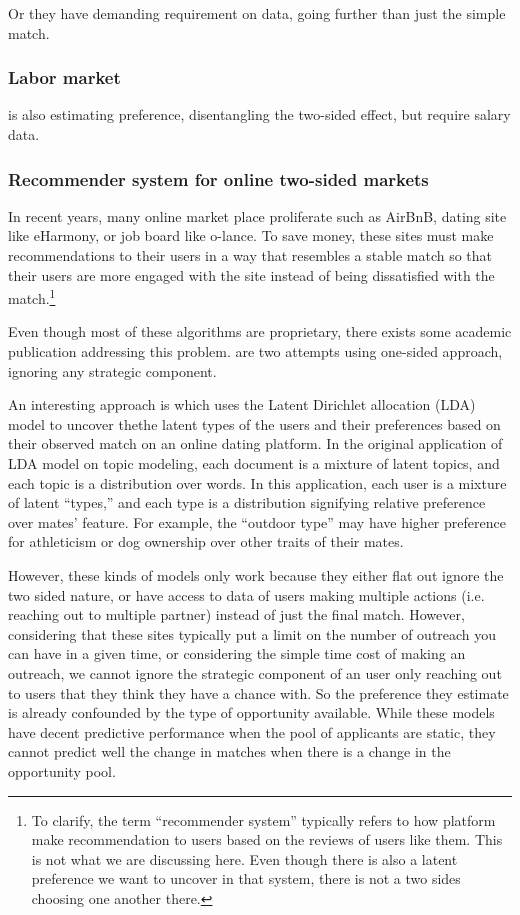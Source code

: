 Or they have demanding requirement on data, going further than just the simple match.

\subsubsection{Labor market}

\citep{Abowd1999} is also estimating preference, disentangling the two-sided
effect, but require salary data.

\subsubsection{Recommender system for online two-sided markets}

In recent years, many online market place proliferate such as AirBnB, dating
site like eHarmony, or job board like o-lance. To save money, these sites must
make recommendations to their users in a way that resembles a stable match so
that their users are more engaged with the site instead of being dissatisfied
with the match.\footnote{To clarify, the term ``recommender system'' typically
  refers to how platform make recommendation to users based on the reviews of
  users like them. This is not what we are discussing here. Even though there is
also a latent preference we want to uncover in that system, there is not a two
sides choosing one another there.}

Even though most of these algorithms are proprietary, there exists some academic
publication addressing this problem. \citep{Hitsch2010, Goswami2014} are two
attempts using one-sided approach, ignoring any strategic component.

An interesting approach is \citep{Tu2014} which uses the Latent Dirichlet
allocation (LDA) model to uncover thethe latent
types of the users and their preferences based on their observed match on an
online dating platform. In the original application of LDA model on
topic modeling, each document is a mixture of latent topics, and each
topic is a distribution over words. In this application, each user is a mixture
of latent ``types,'' and each type is a distribution signifying relative
preference over mates' feature. For example, the ``outdoor type'' may have
higher preference for athleticism or dog ownership over other traits of their
mates.

However, these kinds of models only work because they either flat out ignore the
two sided nature, or have access to data of users making multiple actions (i.e.
reaching out to multiple partner) instead of just the final match. However,
considering that these sites typically put a limit on the number of outreach you
can have in a given time, or considering the simple time cost of making an
outreach, we cannot ignore the strategic component of an user only reaching out
to users that they think they have a chance with. So the preference they
estimate is already confounded by the type of opportunity available. While these
models have decent predictive performance when the pool of applicants are
static, they cannot predict well the change in matches when there is a change in
the opportunity pool.


